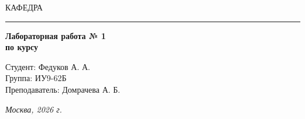 \begin{titlepage}
  \vspace{0.5ex}
  \hspace{-35pt} \noindent \small КАФЕДРА\hspace{50pt} 

  \vspace*{-16pt}
  \hspace{30pt}\rule{0.866\textwidth}{0.4pt}

  \vspace{11em}

  \begin{center}
    \Large {\bf Лабораторная работа № 1} \\
    \large {\bf по курсу } \\
    \large {}

  \end{center}\normalsize

  \vspace{8em}

  \begin{flushright}
    \begin{minipage}{0.5\linewidth}
      {Студент: Федуков А. А. \hspace*{15pt}\\
        Группа: ИУ9-62Б \\
        Преподаватель: Домрачева А. Б.\hspace*{15pt}}
    \end{minipage}
  \end{flushright}
  \bigskip
  \vfill

  \begin{center}
    \textsl{Москва, 2026 г.}
  \end{center}
\end{titlepage}
